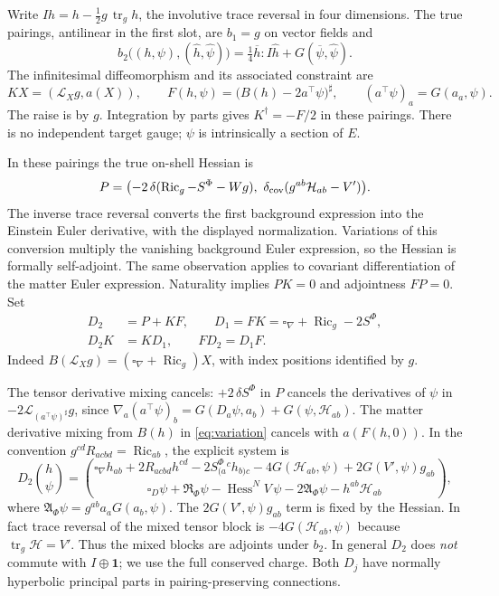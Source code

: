 \documentclass[11pt]{article}
\newcommand{\Ric}{\operatorname{Ric}}
\newcommand{\tr}{\operatorname{tr}}
\newcommand{\id}{\mathbf 1}
\newcommand{\Lie}{\mathcal L}
\newcommand{\HH}{\mathcal H}
\begin{document}
Write \(Ih=h-\tfrac12 g\,\tr_g h\), the involutive trace reversal in four dimensions. The true pairings, antilinear in the first slot, are \(b_1=g\) on vector fields and
\[
 b_2\bigl((h,\psi),(\widehat h,\widehat\psi)\bigr)
     =\tfrac14\overline h:I\widehat h+G(\overline\psi,\widehat\psi).
\]
The infinitesimal diffeomorphism and its associated constraint are
\[
 KX=(\Lie_Xg,a(X)),\qquad
 F(h,\psi)=\bigl(B(h)-2a^\top\psi\bigr)^\sharp,\qquad
 (a^\top\psi)_a=G(a_a,\psi).
\]
The raise is by \(g\). Integration by parts gives \(K^\dagger=-F/2\) in these pairings. There is no independent target gauge; \(\psi\) is intrinsically a section of \(E\).

In these pairings the true on-shell Hessian is
\[
 P=\bigl(-2\,\delta(\Ric_g-S^\Phi-Wg),\
          \delta_{\rm cov}(g^{ab}\HH_{ab}-V')\bigr).
\]
The inverse trace reversal converts the first background expression into the Einstein Euler derivative, with the displayed normalization. Variations of this conversion multiply the vanishing background Euler expression, so the Hessian is formally self-adjoint. The same observation applies to covariant differentiation of the matter Euler expression. Naturality implies \(PK=0\) and adjointness \(FP=0\). Set
\begin{align}
  D_2&=P+KF,\qquad D_1=FK=\square_\nabla+\Ric_g-2S^\Phi,\nonumber\\
  D_2K&=KD_1,\qquad FD_2=D_1F .
  \label{eq:wavecomplex}
\end{align}
Indeed \(B(\Lie_Xg)=(\square_\nabla+\Ric_g)X\), with index positions identified by \(g\).

The tensor derivative mixing cancels: \(+2\,\delta S^\Phi\) in \(P\) cancels the derivatives of \(\psi\) in \(-2\Lie_{(a^\top\psi)^\sharp}g\), since \(\nabla_a(a^\top\psi)_b=G(D_a\psi,a_b)+G(\psi,\HH_{ab})\). The matter derivative mixing from \(B(h)\) in \eqref{eq:variation} cancels with \(a(F(h,0))\). In the convention \(g^{cd}R_{acbd}=\Ric_{ab}\), the explicit system is
\begin{equation}
 D_2\binom{h}{\psi}=
 \binom{\square_\nabla h_{ab}+2R_{acbd}h^{cd}
       -2 S^\Phi_{(a}{}^c h_{b)c}
       -4G(\HH_{ab},\psi)+2G(V',\psi)g_{ab}}
 {\square_D\psi+\mathfrak R_\Phi\psi-\operatorname{Hess}^N V\,\psi
      -2\mathfrak A_\Phi\psi-h^{ab}\HH_{ab}},
 \label{eq:system}
\end{equation}
where \(\mathfrak A_\Phi\psi=g^{ab}a_a G(a_b,\psi)\).
The \(2G(V',\psi)g_{ab}\) term is fixed by the Hessian. In fact trace reversal of the mixed tensor block is \(-4G(\HH_{ab},\psi)\) because \(\tr_g\HH=V'\). Thus the mixed blocks are adjoints under \(b_2\). In general \(D_2\) does \emph{not} commute with \(I\oplus\id\); we use the full conserved charge. Both \(D_j\) have normally hyperbolic principal parts in pairing-preserving connections.
\end{document}

